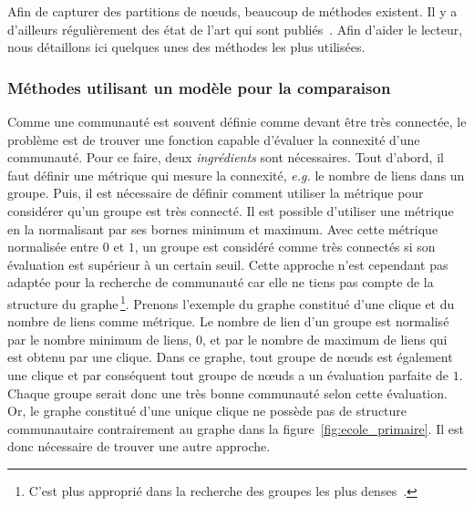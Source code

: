 Afin de capturer des partitions de n\oe uds, beaucoup de méthodes existent.
Il y a d'ailleurs régulièrement des état de l'art qui sont publiés~\cite{Fortunato2010,Plantie2013a, Malliaros2013a, Harenberg2014a}.
Afin d'aider le lecteur, nous détaillons ici quelques unes des méthodes les plus utilisées.

\subsubsection{Méthodes utilisant un modèle pour la comparaison}
\label{def:Modularite}
Comme une communauté est souvent définie comme devant être très connectée, le problème est de trouver une fonction capable d'évaluer la connexité d'une communauté.
Pour ce faire, deux \emph{ingrédients} sont nécessaires.
Tout d'abord, il faut définir une métrique qui mesure la connexité, \emph{e.g.} le nombre de liens dans un groupe.
Puis, il est nécessaire de définir comment utiliser la métrique pour considérer qu'un groupe est très connecté.
Il est possible d'utiliser une métrique en la normalisant par ses bornes minimum et maximum.
Avec cette métrique normalisée entre $0$ et $1$, un groupe est considéré comme très connectés si son évaluation est supérieur à un certain seuil.
Cette approche n'est cependant pas adaptée pour la recherche de communauté car elle ne tiens pas compte de la structure du graphe\,\footnote{C'est plus approprié dans la recherche des groupes les plus denses~\cite{Balalau2015}.}.
Prenons l'exemple du graphe constitué d'une clique et du nombre de liens comme métrique.
Le nombre de lien d'un groupe est normalisé par le nombre minimum de liens, $0$, et par le nombre de maximum de liens qui est obtenu par une clique.
Dans ce graphe, tout groupe de n\oe uds est également une clique et par conséquent tout groupe de n\oe uds a un évaluation parfaite de $1$.
Chaque groupe serait donc une très bonne communauté selon cette évaluation.
Or, le graphe constitué d'une unique clique ne possède pas de structure communautaire contrairement au graphe dans la figure~\ref{fig:ecole_primaire}.
Il est donc nécessaire de trouver une autre approche.

